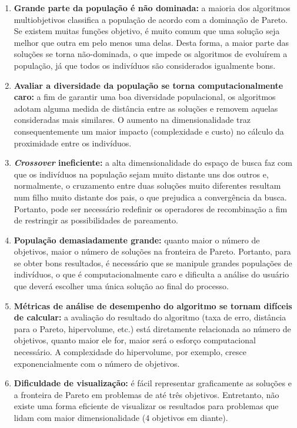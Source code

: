 \begin{enumerate}  
	\item \textbf{Grande parte da população é não dominada:} a maioria dos algoritmos multiobjetivos classifica a população de acordo com a dominação de Pareto. Se existem muitas funções objetivo, é muito comum que uma solução seja melhor que outra em pelo menos uma delas. Desta forma, a maior parte das soluções se torna não-dominada, o que impede os algoritmos de evoluírem a população, já que todos os indivíduos são considerados igualmente bons.
	\item \textbf{Avaliar a diversidade da população se torna computacionalmente caro:} a fim de garantir uma boa diversidade populacional, os algoritmos adotam alguma medida de distância entre as soluções e removem aquelas consideradas mais similares. O aumento na dimensionalidade traz consequentemente um maior impacto (complexidade e custo) no cálculo da proximidade entre os indivíduos. 
	\item \textbf{\textit{Crossover} ineficiente:} a alta dimensionalidade do espaço de busca faz com que os indivíduos na população sejam muito distante uns dos outros e, normalmente, o cruzamento entre duas soluções muito diferentes resultam num filho muito distante dos pais, o que prejudica a convergência da busca. Portanto, pode ser necessário redefinir os operadores de recombinação a fim de restringir as possibilidades de pareamento.
	\item \textbf{População demasiadamente grande:} quanto maior o número de objetivos, maior o número de soluções na fronteira de Pareto. Portanto, para se obter bons resultados, é necessário que se manipule grandes populações de indivíduos, o que é computacionalmente caro e dificulta a análise do usuário que deverá escolher uma única solução ao final do processo.
	\item \textbf{Métricas de análise de desempenho do algoritmo se tornam difíceis de calcular:} a avaliação do resultado do algoritmo (taxa de erro, distância para o Pareto, hipervolume, etc.) está diretamente relacionada ao número de objetivos, quanto maior ele for, maior será o esforço computacional necessário. A complexidade do hipervolume, por exemplo, cresce exponencialmente com o número de objetivos.
	\item \textbf{Dificuldade de visualização:} é fácil representar graficamente as soluções e a fronteira de Pareto em problemas de até três objetivos. Entretanto, não existe uma forma eficiente de visualizar os resultados para problemas que lidam com maior dimensionalidade (4 objetivos em diante).
\end{enumerate}

